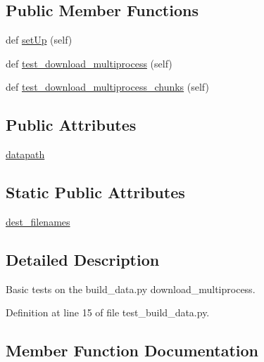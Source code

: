 \subsection*{Public Member Functions}
\begin{DoxyCompactItemize}
\item 
def \hyperlink{classtests_1_1test__build__data_1_1TestBuildData_a778e0feb33f86ce770dc7bf7a3b8a416}{set\+Up} (self)
\item 
def \hyperlink{classtests_1_1test__build__data_1_1TestBuildData_a24ccc6522078dd41dbc5d608bc1297e2}{test\+\_\+download\+\_\+multiprocess} (self)
\item 
def \hyperlink{classtests_1_1test__build__data_1_1TestBuildData_a57a7d34acf8cec7b757605c5659b6e96}{test\+\_\+download\+\_\+multiprocess\+\_\+chunks} (self)
\end{DoxyCompactItemize}
\subsection*{Public Attributes}
\begin{DoxyCompactItemize}
\item 
\hyperlink{classtests_1_1test__build__data_1_1TestBuildData_a4b59ee6d7a834ee32404afe63512db12}{datapath}
\end{DoxyCompactItemize}
\subsection*{Static Public Attributes}
\begin{DoxyCompactItemize}
\item 
\hyperlink{classtests_1_1test__build__data_1_1TestBuildData_a44c09a6faf9f298de2d4a094a25a9f17}{dest\+\_\+filenames}
\end{DoxyCompactItemize}


\subsection{Detailed Description}
\begin{DoxyVerb}Basic tests on the build_data.py download_multiprocess.
\end{DoxyVerb}
 

Definition at line 15 of file test\+\_\+build\+\_\+data.\+py.



\subsection{Member Function Documentation}
\mbox{\label{classtests_1_1test__build__data_1_1TestBuildData_a778e0feb33f86ce770dc7bf7a3b8a416}} 
